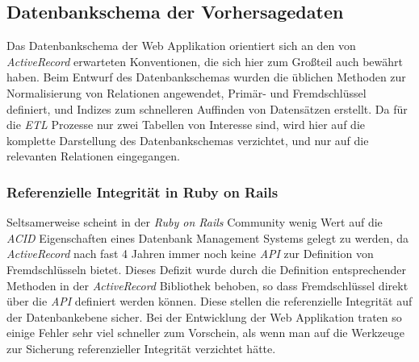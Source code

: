 \subsection{Datenbankschema der Vorhersagedaten}
Das Datenbankschema der Web Applikation orientiert sich an den von
\textit{ActiveRecord} erwarteten Konventionen, die sich hier zum
Großteil auch bewährt haben. Beim Entwurf des Datenbankschemas wurden
die üblichen Methoden zur Normalisierung von Relationen angewendet,
Primär- und Fremdschlüssel definiert, und Indizes zum schnelleren
Auffinden von Datensätzen erstellt. Da für die \textit{ETL} Prozesse
nur zwei Tabellen von Interesse sind, wird hier auf die komplette
Darstellung des Datenbankschemas verzichtet, und nur auf die
relevanten Relationen eingegangen.

\subsubsection{Referenzielle Integrität in Ruby on Rails}
Seltsamerweise scheint in der \textit{Ruby on Rails} Community wenig
Wert auf die \textit{ACID}  Eigenschaften eines Datenbank Management
Systems gelegt zu werden, da \textit{ActiveRecord} nach fast 4 Jahren
immer noch keine \textit{API} zur Definition von Fremdschlüsseln
bietet. Dieses Defizit wurde durch die Definition entsprechender
Methoden in der \textit{ActiveRecord} Bibliothek behoben, so dass
Fremdschlüssel direkt über die \textit{API} definiert werden
können. Diese stellen die referenzielle Integrität auf der
Datenbankebene sicher. Bei der Entwicklung der Web Applikation traten
so einige Fehler sehr viel schneller zum Vorschein, als wenn man auf
die Werkzeuge zur Sicherung referenzieller Integrität verzichtet
hätte.

